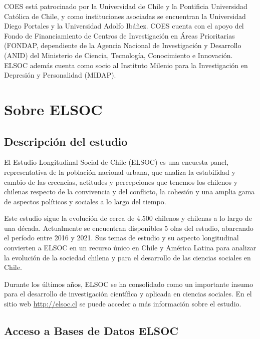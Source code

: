 \documentclass[
  12pt,
  openany]{book}
\begin{document}
COES está patrocinado por la Universidad de Chile y la Pontificia Universidad Católica de Chile, y como instituciones asociadas se encuentran la Universidad Diego Portales y la Universidad Adolfo Ibáñez. COES cuenta con el apoyo del Fondo de Financiamiento de Centros de Investigación en Áreas Prioritarias (FONDAP, dependiente de la Agencia Nacional de Investigación y Desarrollo (ANID) del Ministerio de Ciencia, Tecnología, Conocimiento e Innovación. ELSOC además cuenta como socio al Instituto Milenio para la Investigación en Depresión y Personalidad (MIDAP).

\hypertarget{sobre-elsoc}{%
\chapter{Sobre ELSOC}\label{sobre-elsoc}}

\hypertarget{descripciuxf3n-del-estudio}{%
\section{Descripción del estudio}\label{descripciuxf3n-del-estudio}}

El Estudio Longitudinal Social de Chile (ELSOC) es una encuesta panel, representativa de la población nacional urbana, que analiza la estabilidad y cambio de las creencias, actitudes y percepciones que tenemos los chilenos y chilenas respecto de la convivencia y del conflicto, la cohesión y una amplia gama de aspectos políticos y sociales a lo largo del tiempo.

Este estudio sigue la evolución de cerca de 4.500 chilenos y chilenas a lo largo de una década. Actualmente se encuentran disponibles 5 olas del estudio, abarcando el período entre 2016 y 2021. Sus temas de estudio y su aspecto longitudinal convierten a ELSOC en un recurso único en Chile y América Latina para analizar la evolución de la sociedad chilena y para el desarrollo de las ciencias sociales en Chile.

Durante los últimos años, ELSOC se ha consolidado como un importante insumo para el desarrollo de investigación científica y aplicada en ciencias sociales. En el sitio web \url{http://elsoc.cl} se puede acceder a más información sobre el estudio.

\hypertarget{acceso-a-bases-de-datos-elsoc}{%
\section{Acceso a Bases de Datos ELSOC}\label{acceso-a-bases-de-datos-elsoc}}
\end{document}
